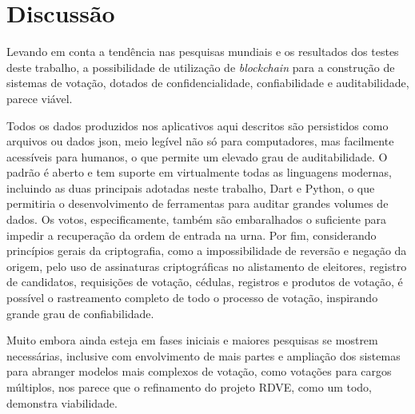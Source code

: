 \chapter{Discussão}

Levando em conta a tendência nas pesquisas mundiais e os resultados dos testes deste trabalho, a possibilidade de utilização de \textit{blockchain} para a construção de sistemas de votação, dotados de confidencialidade, confiabilidade e auditabilidade, parece viável.

Todos os dados produzidos nos aplicativos aqui descritos são persistidos como arquivos ou dados \gls{json}, meio legível não só para computadores, mas facilmente acessíveis para humanos, o que permite um elevado grau de auditabilidade. O padrão é aberto e tem suporte em virtualmente todas as linguagens modernas, incluindo as duas principais adotadas neste trabalho, Dart e Python, o que permitiria o desenvolvimento de ferramentas para auditar grandes volumes de dados. Os votos, especificamente, também são embaralhados o suficiente para impedir a recuperação da ordem de entrada na urna. Por fim, considerando princípios gerais da criptografia, como a impossibilidade de reversão e negação da origem, pelo uso de assinaturas criptográficas no alistamento de eleitores, registro de candidatos, requisições de votação, cédulas, registros e produtos de votação, é possível o rastreamento completo de todo o processo de votação, inspirando grande grau de confiabilidade.

Muito embora ainda esteja em fases iniciais e maiores pesquisas se mostrem necessárias, inclusive com envolvimento de mais partes e ampliação dos sistemas para abranger modelos mais complexos de votação, como votações para cargos múltiplos, nos parece que o refinamento do projeto RDVE, como um todo, demonstra viabilidade.